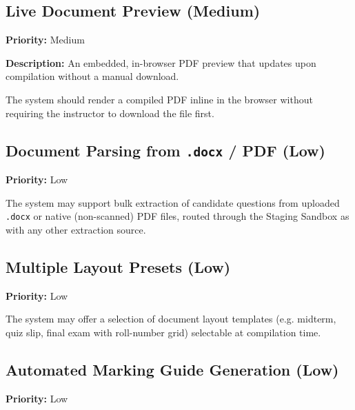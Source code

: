 \documentclass[11pt]{article}
\newcommand{\priority}[1]{\textbf{Priority:} #1}
\newcommand{\reqid}[1]{\textbf{#1}}
\begin{document}
\subsection{Live Document Preview (Medium)}
\priority{Medium}

\textbf{Description:} An embedded, in-browser PDF preview that updates upon
compilation without a manual download.

\begin{description}[nosep,leftmargin=2.2cm]
  \item[\reqid{REQ-13.1}] The system should render a compiled PDF inline in
    the browser without requiring the instructor to download the file
    first.
\end{description}

\subsection{Document Parsing from \texttt{.docx} / PDF (Low)}
\priority{Low}

\begin{description}[nosep,leftmargin=2.2cm]
  \item[\reqid{REQ-14.1}] The system may support bulk extraction of
    candidate questions from uploaded \texttt{.docx} or native (non-scanned)
    PDF files, routed through the Staging Sandbox as with any other
    extraction source.
\end{description}

\subsection{Multiple Layout Presets (Low)}
\priority{Low}

\begin{description}[nosep,leftmargin=2.2cm]
  \item[\reqid{REQ-15.1}] The system may offer a selection of document
    layout templates (e.g. midterm, quiz slip, final exam with roll-number
    grid) selectable at compilation time.
\end{description}

\subsection{Automated Marking Guide Generation (Low)}
\priority{Low}
\end{document}
